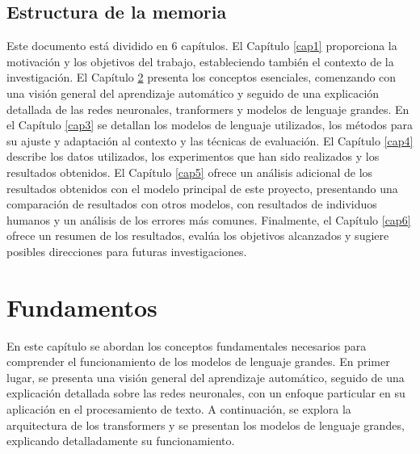 \documentclass[11pt,spanish,listoffigures,listoftables]{tfgetsinf}
\begin{document}
\section{Estructura de la memoria}

Este documento está dividido en 6 capítulos. El Capítulo \ref{cap1} proporciona la motivación y los objetivos del trabajo, estableciendo también el contexto de la investigación. El Capítulo \ref{cap2} presenta los conceptos esenciales, comenzando con una visión general del aprendizaje automático y seguido de una explicación detallada de las redes neuronales, tranformers y modelos de lenguaje grandes. En el Capítulo \ref{cap3} se detallan los modelos de lenguaje utilizados, los métodos para su ajuste y adaptación al contexto y las técnicas de evaluación. El Capítulo \ref{cap4} describe los datos utilizados, los experimentos que han sido realizados y los resultados obtenidos. El Capítulo \ref{cap5} ofrece un análisis adicional de los resultados obtenidos con el modelo principal de este proyecto, presentando una comparación de resultados con otros modelos, con resultados de individuos humanos y un análisis de los errores más comunes. Finalmente, el Capítulo \ref{cap6} ofrece un resumen de los resultados, evalúa los objetivos alcanzados y sugiere posibles direcciones para futuras investigaciones.




\chapter{Fundamentos}\label{cap2}

En este capítulo se abordan los conceptos fundamentales necesarios para comprender el funcionamiento de los modelos de lenguaje grandes. En primer lugar, se presenta una visión general del aprendizaje automático, seguido de una explicación detallada sobre las redes neuronales, con un enfoque particular en su aplicación en el procesamiento de texto. A continuación, se explora la arquitectura de los transformers y se presentan los modelos de lenguaje grandes, explicando detalladamente su funcionamiento.
\end{document}
